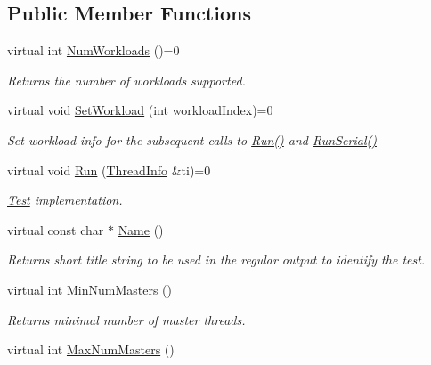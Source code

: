 \subsection*{Public Member Functions}
\begin{DoxyCompactItemize}
\item 
\hypertarget{classPerf_1_1Test_a6c29f916fc475135f7ab216991787233}{}virtual int \hyperlink{classPerf_1_1Test_a6c29f916fc475135f7ab216991787233}{Num\+Workloads} ()=0\label{classPerf_1_1Test_a6c29f916fc475135f7ab216991787233}

\begin{DoxyCompactList}\small\item\em Returns the number of workloads supported. \end{DoxyCompactList}\item 
virtual void \hyperlink{classPerf_1_1Test_a49e2b75f552355cea43b841bba1237b3}{Set\+Workload} (int workload\+Index)=0
\begin{DoxyCompactList}\small\item\em Set workload info for the subsequent calls to \hyperlink{classPerf_1_1Test_a64ad02d5651eb526f14e8d17df229cfb}{Run()} and \hyperlink{classPerf_1_1Test_aa36442055c9cd1267cbdf8a0bf431239}{Run\+Serial()} \end{DoxyCompactList}\item 
virtual void \hyperlink{classPerf_1_1Test_a64ad02d5651eb526f14e8d17df229cfb}{Run} (\hyperlink{structPerf_1_1Test_1_1ThreadInfo}{Thread\+Info} \&ti)=0
\begin{DoxyCompactList}\small\item\em \hyperlink{classPerf_1_1Test}{Test} implementation. \end{DoxyCompactList}\item 
virtual const char $\ast$ \hyperlink{classPerf_1_1Test_a4a4be9dc1805f2bb1b8ad8cf8fe78e94}{Name} ()
\begin{DoxyCompactList}\small\item\em Returns short title string to be used in the regular output to identify the test. \end{DoxyCompactList}\item 
virtual int \hyperlink{classPerf_1_1Test_ac56059ea14218db626951886e7f7f6db}{Min\+Num\+Masters} ()
\begin{DoxyCompactList}\small\item\em Returns minimal number of master threads. \end{DoxyCompactList}\item 
virtual int \hyperlink{classPerf_1_1Test_abbfd7f54b8d823e6a505dc0932a49ef4}{Max\+Num\+Masters} ()

\end{DoxyCompactItemize}
